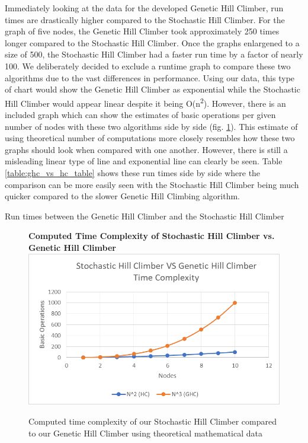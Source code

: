 \documentclass[sigplan,screen]{acmart}
\begin{document}
Immediately looking at the data for the developed Genetic Hill Climber, run
times are drastically higher compared to the Stochastic Hill Climber. For the
graph of five nodes, the Genetic Hill Climber took approximately 250 times
longer compared to the Stochastic Hill Climber. Once the graphs enlargened to a
size of 500, the Stochastic Hill Climber had a faster run time by a factor of
nearly 100. We deliberately decided to exclude a runtime graph to compare these
two algorithms due to the vast differences in performance. Using our data, this
type of chart would show the Genetic Hill Climber as exponential while the
Stochastic Hill Climber would appear linear despite it being
O(n\textsuperscript{2}). However, there is an included graph which can show the
estimates of basic operations per given number of nodes with these two
algorithms side by side (fig. \ref{fig:hc_vs_ghc}). This estimate of using theoretical
number of computations more closely resembles how these two graphs should look
when compared with one another. However, there is still a misleading linear type
of line and exponential line can clearly be seen. Table
\ref{table:ghc_vs_hc_table} shows these run times side by side where the
comparison can be more easily seen with the Stochastic Hill Climber being much
quicker compared to the slower Genetic Hill Climbing algorithm.

\begin{table}[h]
    \setlength\tabcolsep{2pt}
    \centering
    
    \caption{Run times between the Genetic Hill Climber and the Stochastic Hill Climber}
    \label{table:ghc_vs_hc_table}
\end{table}

\begin{figure}[h]
    \centering
    \textbf{Computed Time Complexity of Stochastic Hill Climber vs. Genetic Hill Climber}
    \includegraphics[width=\columnwidth]{assets/hc_vs_ghc.png}
    \caption{Computed time complexity of our Stochastic Hill Climber compared to our Genetic Hill Climber using theoretical mathematical data}
    \label{fig:hc_vs_ghc}
\end{figure}
\end{document}
